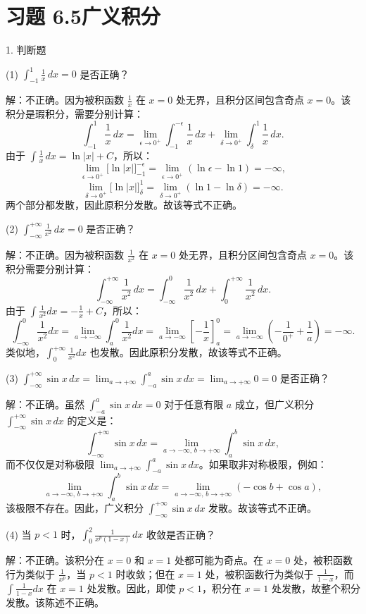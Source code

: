 \section*{习题 6.5\quad 广义积分}

1. 判断题

(1) \(\int_{-1}^{1}\frac{1}{x}\,dx=0\) 是否正确？

解：不正确。因为被积函数 \(\frac{1}{x}\) 在 \(x=0\) 处无界，且积分区间包含奇点 \(x=0\)。该积分是瑕积分，需要分别计算：
\[ \int_{-1}^{1}\frac{1}{x}\,dx=\lim_{\epsilon\to0^{+}}\int_{-1}^{-\epsilon}\frac{1}{x}\,dx+\lim_{\delta\to0^{+}}\int_{\delta}^{1}\frac{1}{x}\,dx. \]
由于 \(\int\frac{1}{x}\,dx=\ln|x|+C\)，所以：
\[ \lim_{\epsilon\to0^{+}}\big[\ln|x|\big]_{-1}^{-\epsilon}=\lim_{\epsilon\to0^{+}}(\ln\epsilon-\ln1)=-\infty, \]
\[ \lim_{\delta\to0^{+}}\big[\ln|x|\big]_{\delta}^{1}=\lim_{\delta\to0^{+}}(\ln1-\ln\delta)=-\infty. \]
两个部分都发散，因此原积分发散。故该等式不正确。

(2) \(\int_{-\infty}^{+\infty}\frac{1}{x^{2}}\,dx=0\) 是否正确？

解：不正确。因为被积函数 \(\frac{1}{x^{2}}\) 在 \(x=0\) 处无界，且积分区间包含奇点 \(x=0\)。该积分需要分别计算：
\[ \int_{-\infty}^{+\infty}\frac{1}{x^{2}}\,dx=\int_{-\infty}^{0}\frac{1}{x^{2}}\,dx+\int_{0}^{+\infty}\frac{1}{x^{2}}\,dx. \]
由于 \(\int\frac{1}{x^{2}}dx=-\frac{1}{x}+C\)，所以：
\[ \int_{-\infty}^{0}\frac{1}{x^{2}}dx=\lim_{a\to-\infty}\int_{a}^{0}\frac{1}{x^{2}}dx=\lim_{a\to-\infty}\left[-\frac{1}{x}\right]_{a}^{0}=\lim_{a\to-\infty}\left(-\frac{1}{0^{+}}+\frac{1}{a}\right)=-\infty. \]
类似地，\(\int_{0}^{+\infty}\frac{1}{x^{2}}dx\) 也发散。因此原积分发散，故该等式不正确。

(3) \(\int_{-\infty}^{+\infty}\sin x\,dx=\lim_{a\to+\infty}\int_{-a}^{a}\sin x\,dx=\lim_{a\to+\infty}0=0\) 是否正确？

解：不正确。虽然 \(\int_{-a}^{a}\sin x\,dx=0\) 对于任意有限 \(a\) 成立，但广义积分 \(\int_{-\infty}^{+\infty}\sin x\,dx\) 的定义是：
\[ \int_{-\infty}^{+\infty}\sin x\,dx=\lim_{a\to-\infty,\,b\to+\infty}\int_{a}^{b}\sin x\,dx, \]
而不仅仅是对称极限 \(\lim_{a\to+\infty}\int_{-a}^{a}\sin x\,dx\)。如果取非对称极限，例如：
\[ \lim_{a\to-\infty,\,b\to+\infty}\int_{a}^{b}\sin x\,dx=\lim_{a\to-\infty,\,b\to+\infty}(-\cos b+\cos a), \]
该极限不存在。因此，广义积分 \(\int_{-\infty}^{+\infty}\sin x\,dx\) 发散。故该等式不正确。

(4) 当 \(p<1\) 时，\(\int_{0}^{2}\frac{1}{x^{p}(1-x)}\,dx\) 收敛是否正确？

解：不正确。该积分在 \(x=0\) 和 \(x=1\) 处都可能为奇点。在 \(x=0\) 处，被积函数行为类似于 \(\frac{1}{x^{p}}\)，当 \(p<1\) 时收敛；但在 \(x=1\) 处，被积函数行为类似于 \(\frac{1}{1-x}\)，而 \(\int\frac{1}{1-x}dx\) 在 \(x=1\) 处发散。因此，即使 \(p<1\)，积分在 \(x=1\) 处发散，故整个积分发散。该陈述不正确。

